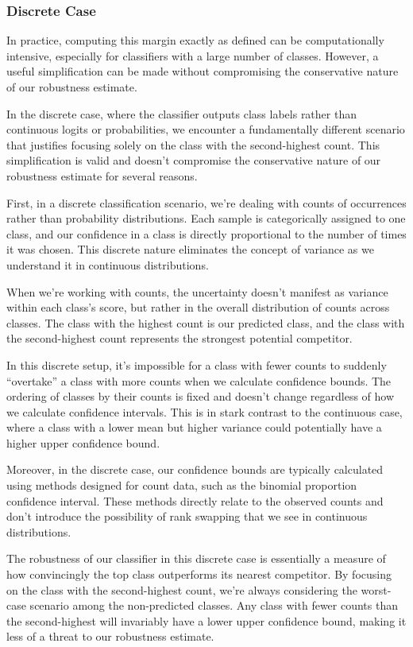 \subsubsection{Discrete Case}\label{subsubsec:discrete-case}
In practice, computing this margin exactly as defined can be computationally intensive, especially for classifiers with a large number of classes.
However, a useful simplification can be made without compromising the conservative nature of our robustness estimate.

In the discrete case, where the classifier outputs class labels rather than continuous logits or probabilities, we encounter a fundamentally different scenario that justifies focusing solely on the class with the second-highest count.
This simplification is valid and doesn't compromise the conservative nature of our robustness estimate for several reasons.

First, in a discrete classification scenario, we're dealing with counts of occurrences rather than probability distributions.
Each sample is categorically assigned to one class, and our confidence in a class is directly proportional to the number of times it was chosen.
This discrete nature eliminates the concept of variance as we understand it in continuous distributions.

When we're working with counts, the uncertainty doesn't manifest as variance within each class's score, but rather in the overall distribution of counts across classes.
The class with the highest count is our predicted class, and the class with the second-highest count represents the strongest potential competitor.

In this discrete setup, it's impossible for a class with fewer counts to suddenly ``overtake'' a class with more counts when we calculate confidence bounds.
The ordering of classes by their counts is fixed and doesn't change regardless of how we calculate confidence intervals.
This is in stark contrast to the continuous case, where a class with a lower mean but higher variance could potentially have a higher upper confidence bound.

Moreover, in the discrete case, our confidence bounds are typically calculated using methods designed for count data, such as the binomial proportion confidence interval.
These methods directly relate to the observed counts and don't introduce the possibility of rank swapping that we see in continuous distributions.

The robustness of our classifier in this discrete case is essentially a measure of how convincingly the top class outperforms its nearest competitor.
By focusing on the class with the second-highest count, we're always considering the worst-case scenario among the non-predicted classes.
Any class with fewer counts than the second-highest will invariably have a lower upper confidence bound, making it less of a threat to our robustness estimate.


